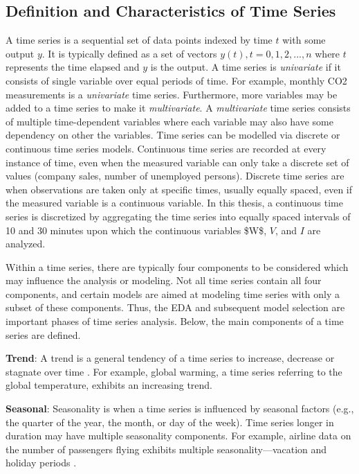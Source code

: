 \subsection{Definition and Characteristics of Time Series}

A time series is a sequential set of data points indexed by time $t$ with some output $y$. It is typically defined as a set of vectors $y(t), t = 0, 1, 2,. . .,n$ where $t$ represents the time elapsed and $y$ is the output. A time series is \textit{univariate} if it consists of single variable over equal periods of time. For example, monthly CO2 measurements is a \textit{univariate} time series. Furthermore, more variables may be added to a time series to make it \textit{multivariate}. A \textit{multivariate} time series consists of multiple time-dependent variables where each variable may also have some dependency on other the variables. Time series can be modelled via discrete or continuous time series models. Continuous time series are recorded at every instance of time, even when the measured variable can only take a discrete set of values (company sales, number of unemployed persons). Discrete time series are when observations are taken only at specific times, usually equally spaced, even if the measured variable is a continuous variable. In this thesis, a continuous time series is discretized by aggregating the time series into equally spaced intervals of 10 and 30 minutes upon which the continuous variables \ac{$W$}, $V$, and $I$ are analyzed. 

Within a time series, there are typically four components to be considered which may influence the analysis or modeling. Not all time series contain all four components, and certain models are aimed at modeling time series with only a subset of these components. Thus, the EDA and subsequent model selection are important phases of time series analysis. Below, the main components of a time series are defined.

\textbf{Trend}: A trend is a general tendency of a time series to increase, decrease or stagnate over time \cite{tsa}. For example, global warming, a time series referring to the global temperature, exhibits an increasing trend. 

\textbf{Seasonal}: Seasonality is when a time series is influenced by seasonal factors (e.g., the quarter of the year, the month, or day of the week). Time series longer in duration may have multiple seasonality components. For example, airline data on the number of passengers flying exhibits multiple seasonality—vacation and holiday periods \cite{tsa}.

